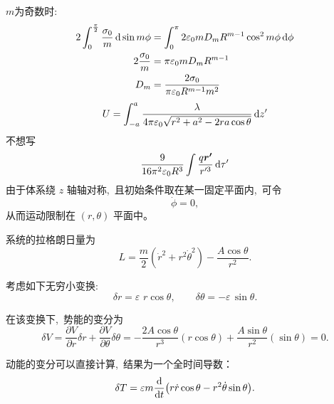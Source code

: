 $m$为奇数时:
\begin{align*}
    2\int_{0}^{\frac{\pi}{2}}\frac{\sigma_0}{m}\dif \sin m\phi
    &=\int_{0}^{\pi}2\varepsilon_0mD_mR^{m-1}\cos^2 m\phi\dif \phi\\
    2\frac{\sigma_0}{m}
    &=\pi\varepsilon_0mD_mR^{m-1}\\
    D_m&=\frac{2\sigma_0}{\pi\varepsilon_0R^{m-1}m^2}
\end{align*}
\begin{align*}
    U=\int_{-a}^{a}\frac{\lambda}{4\pi\varepsilon_0\sqrt{r^2+a^2-2ra\cos\theta}}\dif z'
\end{align*}
不想写
\begin{align*}
    \frac{9}{16\pi^2\varepsilon_0R^3}\int\frac{q\boldsymbol{r'}}{r'^3}\dif\tau'
\end{align*}
由于体系绕 $z$ 轴轴对称, \,且初始条件取在某一固定平面内, \,可令
\[
\dot\phi=0,
\]
从而运动限制在 $(r,\theta)$ 平面中。


系统的拉格朗日量为
\begin{equation}
L
=
\frac{m}{2}\left(\dot r^2+r^2\dot\theta^2\right)
-
\frac{A\cos\theta}{r^2}.
\end{equation}


考虑如下无穷小变换:
\begin{equation}
\delta r = \varepsilon\, \,r\cos\theta,
\qquad
\delta\theta = -\varepsilon\,\sin\theta .
\end{equation}

在该变换下, \,势能的变分为
\[
\delta V
=
\frac{\partial V}{\partial r}\delta r
+
\frac{\partial V}{\partial\theta}\delta\theta
=
-\frac{2A\cos\theta}{r^3}(r\cos\theta)
+
\frac{A\sin\theta}{r^2}(\sin\theta)
=0.
\]

动能的变分可以直接计算, \,结果为一个全时间导数：
\[
\delta T
=
\varepsilon m
\frac{\dif}{\dif t}
\bigl(
r\dot r\cos\theta
-
r^2\dot\theta\sin\theta
\bigr).
\]

